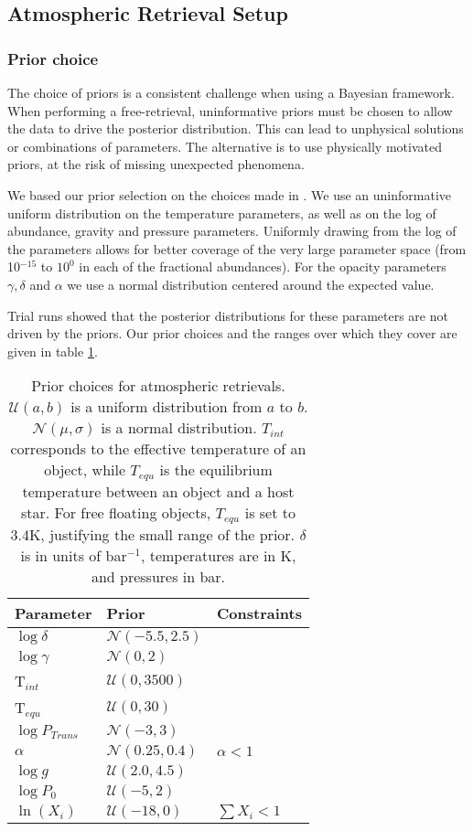\subsection{Atmospheric Retrieval Setup}
\subsubsection{Prior choice}
The choice of priors is a consistent challenge when using a Bayesian framework.
When performing a free-retrieval, uninformative priors must be chosen to allow the data to drive the posterior distribution.
This can lead to unphysical solutions or combinations of parameters.
The alternative is to use physically motivated priors, at the risk of missing unexpected phenomena.

We based our prior selection on the choices made in \parencite{Molliere2019}.
We use an uninformative uniform distribution on the temperature parameters, as well as on the log of abundance, gravity and pressure parameters.
Uniformly drawing from the log of the parameters allows for better coverage of the very large parameter space (from 10$^{-15}$ to $10^{0}$ in each of the fractional abundances).
For the opacity parameters $\gamma,\delta$ and $\alpha$ we use a normal distribution centered around the expected value. 

Trial runs showed that the posterior distributions for these parameters are not driven by the priors.
Our prior choices and the ranges over which they cover are given in table \ref{tab:priors}.
\begin{table}[t]
	\centering
	\begin{tabular}{lll}
		\toprule
		\textbf{Parameter} & \textbf{Prior} & \textbf{Constraints}\\
		\midrule
		$\log\delta$ & $\mathcal{N}(-5.5,2.5)$&\\
		$\log\gamma$ & $\mathcal{N}(0,2)$&\\
		T$_{int}$ & $\mathcal{U}(0,3500)$&\\
		T$_{equ}$ & $\mathcal{U}(0,30)$&\\
		$\log P_{Trans}$ & $\mathcal{N}(-3,3)$&\\
		$\alpha$ & $\mathcal{N}(0.25,0.4)$&$\alpha < 1$\\
		$\log g$ & $\mathcal{U}(2.0,4.5)$&\\
		$\log P_{0}$ & $\mathcal{U}(-5,2)$&\\
		$\ln(X_{i})$ & $\mathcal{U}(-18,0)$ & $\sum X_{i} < 1$\\
		\bottomrule		
	\end{tabular}
	\caption{Prior choices for atmospheric retrievals. $\mathcal{U}(a,b)$ is a uniform distribution from $a$ to $b$. $\mathcal{N}(\mu,\sigma)$ is a normal distribution. $T_{int}$ corresponds to the effective temperature of an object, while $T_{equ}$ is the equilibrium temperature between an object and a host star. For free floating objects, $T_{equ}$ is set to 3.4K, justifying the small range of the prior. $\delta$ is in units of bar$^{-1}$, temperatures are in K, and pressures in bar.}
	\label{tab:priors}
\end{table}

